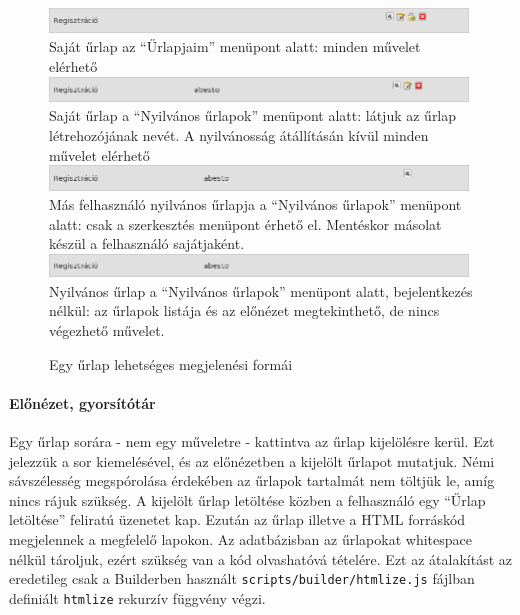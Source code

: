 \documentclass[12pt,a4paper,twoside]{article}
\begin{document}
\begin{figure}[H]
\centering
\small
  \includegraphics[width=420px]{private.png}
  Saját űrlap az ``Űrlapjaim'' menüpont alatt: minden művelet elérhető\\

  \vspace{.5cm}
  \includegraphics[width=420px]{public_sajat.png}
  Saját űrlap a ``Nyilvános űrlapok'' menüpont alatt: látjuk az űrlap
  létrehozójának nevét. A nyilvánosság átállításán kívül minden művelet
  elérhető\\

  \vspace{.5cm}
  \includegraphics[width=420px]{public_mas.png}
  Más felhasználó nyilvános űrlapja a ``Nyilvános űrlapok'' menüpont alatt: csak
  a szerkesztés menüpont érhető el. Mentéskor másolat készül a felhasználó
  sajátjaként.\\

  \vspace{.5cm}
  \includegraphics[width=420px]{public_none.png}
  Nyilvános űrlap a ``Nyilvános űrlapok'' menüpont alatt, bejelentkezés nélkül:
  az űrlapok listája és az előnézet megtekinthető, de nincs végezhető művelet.
\normalsize
  \caption{Egy űrlap lehetséges megjelenési formái}
\end{figure}
\vspace{.7cm}


\paragraph{Előnézet, gyorsítótár}
Egy űrlap sorára - nem egy műveletre - kattintva az űrlap kijelölésre kerül. Ezt
jelezzük a sor kiemelésével, és az előnézetben a kijelölt űrlapot mutatjuk. Némi
sávszélesség megspórolása érdekében az űrlapok tartalmát nem töltjük le, amíg
nincs rájuk szükség. A kijelölt űrlap letöltése közben a felhasználó egy ``Űrlap
letöltése'' feliratú üzenetet kap. Ezután az űrlap illetve a HTML forráskód
megjelennek a megfelelő lapokon. Az adatbázisban az űrlapokat whitespace nélkül
tároljuk, ezért szükség van a kód olvashatóvá tételére. Ezt az átalakítást az
eredetileg csak a Builderben használt \texttt{scripts/builder/htmlize.js}
fájlban definiált \texttt{htmlize} rekurzív függvény végzi.
\end{document}
